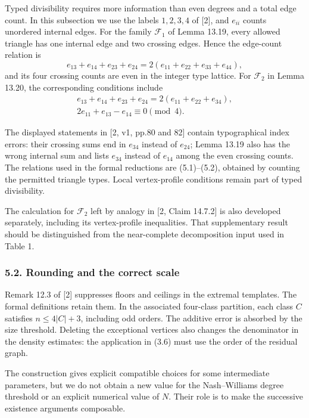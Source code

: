 \documentclass[english,11pt,a4paper]{article}
\begin{document}
Typed divisibility requires more information than even degrees and a total edge count. In this subsection we use the labels \(1,2,3,4\) of {[}2{]}, and \(e_{ii}\) counts unordered internal edges. For the family \(\mathcal F_1\) of Lemma 13.19, every allowed triangle has one internal edge and two crossing edges. Hence the edge-count relation is \[e_{13}+e_{14}+e_{23}+e_{24}
=2(e_{11}+e_{22}+e_{33}+e_{44}),
\tag{5.1}\] and its four crossing counts are even in the integer type lattice. For \(\mathcal F_2\) in Lemma 13.20, the corresponding conditions include \[\begin{gathered}
e_{13}+e_{14}+e_{23}+e_{24}=2(e_{11}+e_{22}+e_{34}),\\
2e_{11}+e_{13}-e_{14}\equiv0\pmod4.
\end{gathered}
\tag{5.2}\]

The displayed statements in {[}2, v1, pp.80 and 82{]} contain typographical index errors: their crossing sums end in \(e_{34}\) instead of \(e_{24}\); Lemma 13.19 also has the wrong internal sum and lists \(e_{34}\) instead of \(e_{14}\) among the even crossing counts. The relations used in the formal reductions are (5.1)--(5.2), obtained by counting the permitted triangle types. Local vertex-profile conditions remain part of typed divisibility.

The calculation for \(\mathcal F_2\) left by analogy in {[}2, Claim 14.7.2{]} is also developed separately, including its vertex-profile inequalities. That supplementary result should be distinguished from the near-complete decomposition input used in Table 1.

\subsubsection{5.2. Rounding and the correct scale}\label{rounding-and-the-correct-scale}

Remark 12.3 of {[}2{]} suppresses floors and ceilings in the extremal templates. The formal definitions retain them. In the associated four-class partition, each class \(C\) satisfies \(n\le4|C|+3\), including odd orders. The additive error is absorbed by the size threshold. Deleting the exceptional vertices also changes the denominator in the density estimates: the application in (3.6) must use the order of the residual graph.

The construction gives explicit compatible choices for some intermediate parameters, but we do not obtain a new value for the Nash--Williams degree threshold or an explicit numerical value of \(N\). Their role is to make the successive existence arguments composable.
\end{document}
